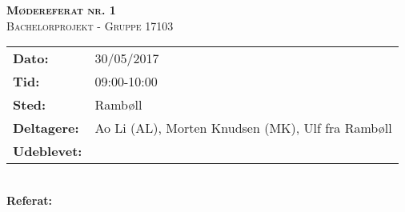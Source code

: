 
\newcommand{\HRule}{\rule{\linewidth}{0.1mm}}


	\begin{center}
		{\huge \bfseries \textsc{Mødereferat nr. 1}}\\
		\textsc{\large Bachelorprojekt - Gruppe 17103}\\[0.3cm]
	\end{center}
	\begin{tabular}{ll}
	\large \textbf{Dato:} & 30/05/2017  	\\ %
	\large \textbf{Tid:}  & 09:00-10:00 	\\ %
	\large \textbf{Sted:} & Rambøll		\\ %
	\large \textbf{Deltagere:} & Ao Li (AL), Morten Knudsen (MK), Ulf fra Rambøll \\
	\large \textbf{Udeblevet:}
	\end{tabular}\\
	\phantom{\,}\hspace{0.1em} \large \textbf{Referat:}
